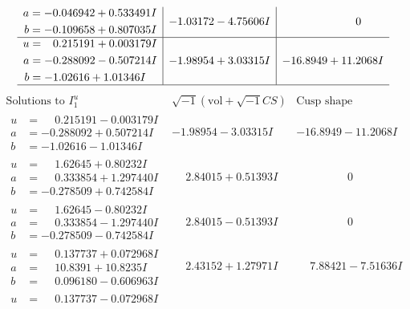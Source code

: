\documentclass[1p]{elsarticle_modified}
\theoremstyle{definition}
\newcommand{\I}{\sqrt{-1}}
\begin{document}
$$\begin{array}{c|c|c}
\begin{aligned}
a &= -0.046942 + 0.533491 I \\
b &= -0.109658 + 0.807035 I\end{aligned}
 & -1.03172 - 4.75606 I & \phantom{-0.000000 } 0 \\ \hline\begin{aligned}
u &= \phantom{-}0.215191 + 0.003179 I \\
a &= -0.288092 - 0.507214 I \\
b &= -1.02616 + 1.01346 I\end{aligned}
 & -1.98954 + 3.03315 I & -16.8949 + 11.2068 I\\
 \hline 
 \end{array}$$\newpage$$\begin{array}{c|c|c}  
\text{Solutions to }I^u_{1}& \I (\text{vol} + \sqrt{-1}CS) & \text{Cusp shape}\\
 \hline 
\begin{aligned}
u &= \phantom{-}0.215191 - 0.003179 I \\
a &= -0.288092 + 0.507214 I \\
b &= -1.02616 - 1.01346 I\end{aligned}
 & -1.98954 - 3.03315 I & -16.8949 - 11.2068 I \\ \hline\begin{aligned}
u &= \phantom{-}1.62645 + 0.80232 I \\
a &= \phantom{-}0.333854 + 1.297440 I \\
b &= -0.278509 + 0.742584 I\end{aligned}
 & \phantom{-}2.84015 + 0.51393 I & \phantom{-0.000000 } 0 \\ \hline\begin{aligned}
u &= \phantom{-}1.62645 - 0.80232 I \\
a &= \phantom{-}0.333854 - 1.297440 I \\
b &= -0.278509 - 0.742584 I\end{aligned}
 & \phantom{-}2.84015 - 0.51393 I & \phantom{-0.000000 } 0 \\ \hline\begin{aligned}
u &= \phantom{-}0.137737 + 0.072968 I \\
a &= \phantom{-}10.8391 + 10.8235 I \\
b &= \phantom{-}0.096180 - 0.606963 I\end{aligned}
 & \phantom{-}2.43152 + 1.27971 I & \phantom{-}7.88421 - 7.51636 I \\ \hline\begin{aligned}
u &= \phantom{-}0.137737 - 0.072968 I \\

\end{aligned}
\end{array}$$
\end{document}
